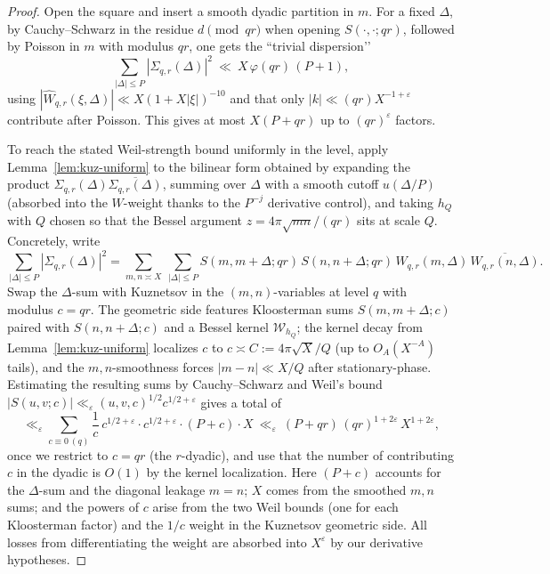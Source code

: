 \documentclass[11pt]{article}
\theoremstyle{definition}
\theoremstyle{remark}
\begin{document}
\begin{proof}
	Open the square and insert a smooth dyadic partition in $m$. For a fixed $\Delta$, by Cauchy–Schwarz in the residue $d\!\!\pmod{qr}$ when opening $S(\cdot,\cdot;qr)$, followed by Poisson in $m$ with modulus $qr$, one gets the ``trivial dispersion’’
	\[
		\sum_{|\Delta|\le P}\!|\Sigma_{q,r}(\Delta)|^2 \ \ll\ X\,\varphi(qr)\,(P+1),
	\]
	using $|\widehat W_{q,r}(\xi,\Delta)|\ll X(1+X|\xi|)^{-10}$ and that only $|k|\ll (qr)X^{-1+\varepsilon}$ contribute after Poisson. This gives at most $X(P+qr)$ up to $(qr)^\varepsilon$ factors.

	To reach the stated Weil-strength bound uniformly in the level, apply Lemma~\ref{lem:kuz-uniform} to the bilinear form obtained by expanding the product $\Sigma_{q,r}(\Delta)\overline{\Sigma_{q,r}(\Delta)}$, summing over $\Delta$ with a smooth cutoff $u(\Delta/P)$ (absorbed into the $W$-weight thanks to the $P^{-j}$ derivative control), and taking $h_Q$ with $Q$ chosen so that the Bessel argument $z=4\pi\sqrt{mn}/(qr)$ sits at scale $Q$. Concretely, write
	\[
		\sum_{|\Delta|\le P}\!|\Sigma_{q,r}(\Delta)|^2
		=\sum_{m,n\asymp X}\ \sum_{|\Delta|\le P} S(m,m+\Delta;qr)\,S(n,n+\Delta;qr)\,W_{q,r}(m,\Delta)\,\overline{W_{q,r}(n,\Delta)}.
	\]
	Swap the $\Delta$-sum with Kuznetsov in the $(m,n)$-variables at level $q$ with modulus $c=qr$. The geometric side features Kloosterman sums $S(m,m+\Delta;c)$ paired with $S(n,n+\Delta;c)$ and a Bessel kernel $\mathcal W_{h_Q}$; the kernel decay from Lemma~\ref{lem:kuz-uniform} localizes $c$ to $c\asymp C:=4\pi\sqrt{X}/Q$ (up to $O_A(X^{-A})$ tails), and the $m,n$-smoothness forces $|m-n|\ll X/Q$ after stationary-phase. Estimating the resulting sums by Cauchy–Schwarz and Weil’s bound
	\(
	|S(u,v;c)|\ll_\varepsilon (u,v,c)^{1/2} c^{1/2+\varepsilon}
	\)
	gives a total of
	\[
		\ll_\varepsilon \sum_{c\equiv 0\ (q)} \frac{1}{c}\, c^{1/2+\varepsilon}\cdot c^{1/2+\varepsilon}\cdot (P+c)\cdot X
		\ \ll_\varepsilon\ (P+qr)\,(qr)^{1+2\varepsilon}\,X^{1+2\varepsilon},
	\]
	once we restrict to $c=qr$ (the $r$-dyadic), and use that the number of contributing $c$ in the dyadic is $O(1)$ by the kernel localization. Here $(P+c)$ accounts for the $\Delta$-sum and the diagonal leakage $m=n$; $X$ comes from the smoothed $m,n$ sums; and the powers of $c$ arise from the two Weil bounds (one for each Kloosterman factor) and the $1/c$ weight in the Kuznetsov geometric side. All losses from differentiating the weight are absorbed into $X^\varepsilon$ by our derivative hypotheses.
\end{proof}
\end{document}
